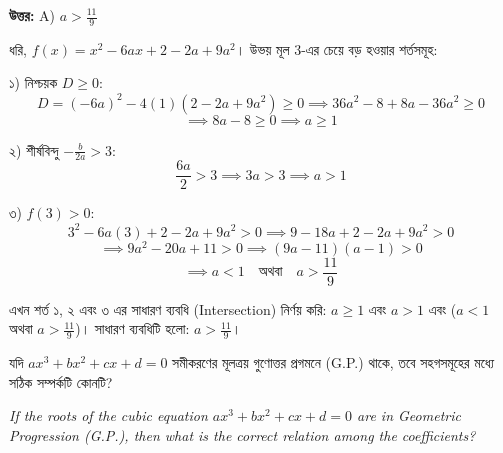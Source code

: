 \documentclass[12pt, a4paper]{article}
\begin{document}
\vspace{0.5em}
\begin{tcolorbox}[answerbox]
    \textbf{\color{success} উত্তর:} A) $a > \frac{11}{9}$
\end{tcolorbox}
\vspace{1em}

\begin{tcolorbox}[solutionbox={সমাধান (Solution)}]
    \noindent
    ধরি, $f(x) = x^2 - 6ax + 2 - 2a + 9a^2$। উভয় মূল $3$-এর চেয়ে বড় হওয়ার শর্তসমূহ:
    
    \vspace{0.5em}
    ১) নিশ্চয়ক $D \ge 0$:
    \[ D = (-6a)^2 - 4(1)(2 - 2a + 9a^2) \ge 0 \implies 36a^2 - 8 + 8a - 36a^2 \ge 0 \]
    \[ \implies 8a - 8 \ge 0 \implies a \ge 1 \]
    
    \vspace{0.5em}
    ২) শীর্ষবিন্দু $-\frac{b}{2a} > 3$:
    \[ \frac{6a}{2} > 3 \implies 3a > 3 \implies a > 1 \]
    
    \vspace{0.5em}
    ৩) $f(3) > 0$:
    \[ 3^2 - 6a(3) + 2 - 2a + 9a^2 > 0 \implies 9 - 18a + 2 - 2a + 9a^2 > 0 \]
    \[ \implies 9a^2 - 20a + 11 > 0 \implies (9a-11)(a-1) > 0 \]
    \[ \implies a < 1 \quad \text{অথবা} \quad a > \frac{11}{9} \]
    
    \vspace{0.5em}
    এখন শর্ত ১, ২ এবং ৩ এর সাধারণ ব্যবধি (Intersection) নির্ণয় করি:
    $a \ge 1$ এবং $a > 1$ এবং ($a < 1$ অথবা $a > \frac{11}{9}$)। সাধারণ ব্যবধিটি হলো: $a > \frac{11}{9}$।
\end{tcolorbox}
\vspace{1em}

\begin{tcolorbox}[questionbox={প্রশ্ন (Question) 44}]
    \noindent
    যদি $ax^3 + bx^2 + cx + d = 0$ সমীকরণের মূলত্রয় গুণোত্তর প্রগমনে (G.P.) থাকে, তবে সহগসমূহের মধ্যে সঠিক সম্পর্কটি কোনটি?
    
    \vspace{0.8em}
    \begin{english}
    \noindent\textit{\color{darkgray}
    If the roots of the cubic equation $ax^3 + bx^2 + cx + d = 0$ are in Geometric Progression (G.P.), then what is the correct relation among the coefficients?
    }
    \end{english}
\end{tcolorbox}
\end{document}
